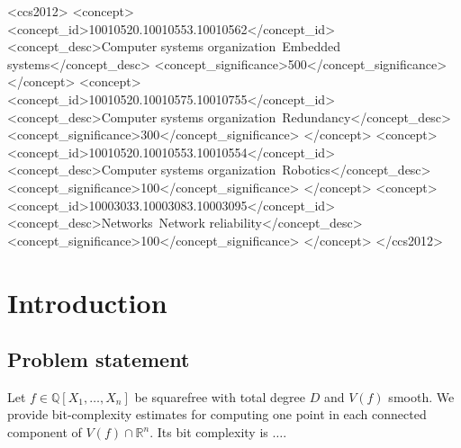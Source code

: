 \documentclass[sigconf]{acmart}
\def\R{\mathbb{R}}
\begin{document}
\begin{CCSXML}
<ccs2012>
 <concept>
  <concept_id>10010520.10010553.10010562</concept_id>
  <concept_desc>Computer systems organization~Embedded systems</concept_desc>
  <concept_significance>500</concept_significance>
 </concept>
 <concept>
  <concept_id>10010520.10010575.10010755</concept_id>
  <concept_desc>Computer systems organization~Redundancy</concept_desc>
  <concept_significance>300</concept_significance>
 </concept>
 <concept>
  <concept_id>10010520.10010553.10010554</concept_id>
  <concept_desc>Computer systems organization~Robotics</concept_desc>
  <concept_significance>100</concept_significance>
 </concept>
 <concept>
  <concept_id>10003033.10003083.10003095</concept_id>
  <concept_desc>Networks~Network reliability</concept_desc>
  <concept_significance>100</concept_significance>
 </concept>
</ccs2012>
\end{CCSXML}




\maketitle
%
%
%
%
\section{Introduction}
%
\subsection{Problem statement}
%
Let $f \in \mathbb{Q}[X_1,\hdots,X_n]$ be squarefree with total degree $D$ and $V(f)$ smooth. We provide bit-complexity estimates for computing one point in each connected component of $V(f)\cap \R^n.$ Its bit complexity is $\hdots$.
%
\end{document}
